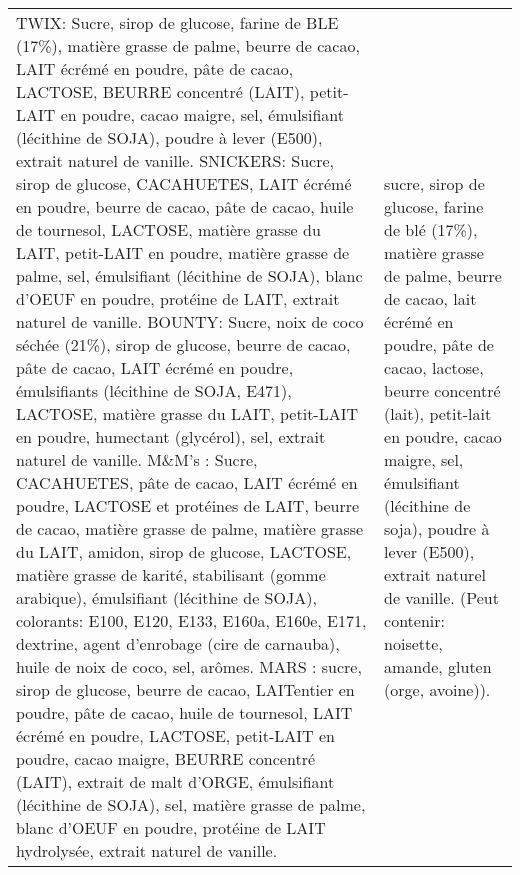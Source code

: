 \begin{tabular}{p{7cm}p{7cm}}
 TWIX: Sucre, sirop de glucose, farine de BLE (17\%), matière grasse de palme, beurre de cacao, LAIT écrémé en poudre, pâte de cacao, LACTOSE, BEURRE concentré (LAIT), petit-LAIT en poudre, cacao maigre, sel, émulsifiant (lécithine de SOJA), poudre à lever (E500), extrait naturel de vanille. SNICKERS: Sucre, sirop de glucose, CACAHUETES, LAIT écrémé en poudre, beurre de cacao, pâte de cacao, huile de tournesol, LACTOSE, matière grasse du LAIT, petit-LAIT en poudre, matière grasse de palme, sel, émulsifiant (lécithine de SOJA), blanc d'OEUF en poudre, protéine de LAIT, extrait naturel de vanille.  BOUNTY: Sucre, noix de coco séchée (21\%), sirop de glucose, beurre de cacao, pâte de cacao, LAIT écrémé en poudre, émulsifiants (lécithine de SOJA, E471), LACTOSE, matière grasse du LAIT, petit-LAIT en poudre, humectant (glycérol), sel, extrait naturel de vanille. M\&M's : Sucre, CACAHUETES, pâte de cacao, LAIT écrémé en poudre, LACTOSE et protéines de LAIT, beurre de cacao, matière grasse de palme, matière grasse du LAIT, amidon, sirop de glucose, LACTOSE, matière grasse de karité, stabilisant (gomme arabique), émulsifiant (lécithine de SOJA), colorants: E100, E120, E133, E160a, E160e, E171, dextrine, agent d'enrobage (cire de carnauba), huile de noix de coco, sel, arômes.  MARS : sucre, sirop de glucose, beurre de cacao, LAITentier en poudre, pâte de cacao, huile de tournesol, LAIT écrémé en poudre, LACTOSE, petit-LAIT en poudre, cacao maigre, BEURRE concentré (LAIT), extrait de malt d'ORGE, émulsifiant (lécithine de SOJA), sel, matière grasse de palme, blanc d'OEUF en poudre, protéine de LAIT hydrolysée, extrait naturel de vanille. &                                                                                                                                                                                                       sucre, sirop de glucose, farine de blé (17\%), matière grasse de palme, beurre de cacao, lait écrémé en poudre, pâte de cacao, lactose, beurre concentré (lait), petit-lait en poudre, cacao maigre, sel, émulsifiant (lécithine de soja), poudre à lever (E500), extrait naturel de vanille. (Peut contenir: noisette, amande, gluten (orge, avoine)). \\

\end{tabular}
